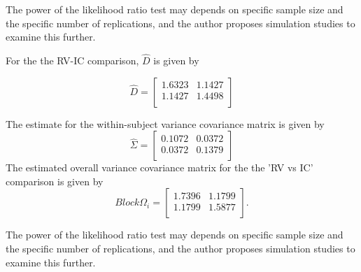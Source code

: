 The power of the
likelihood ratio test may depends on specific sample size and the
specific number of  replications, and the author proposes
simulation studies to examine this further.



For the the RV-IC comparison, $\hat{D}$ is given by


\begin{equation}
\hat{D}= \left[ \begin{array}{cc}
1.6323 & 1.1427  \\
1.1427 & 1.4498 \\
\end{array} \right]
\end{equation}

The estimate for the within-subject variance covariance matrix is
given by
\begin{equation}
\hat{\Sigma}= \left[ \begin{array}{cc}
0.1072 & 0.0372  \\
0.0372 & 0.1379  \\
\end{array}\right]
\end{equation}
The estimated overall variance covariance matrix for the the 'RV
vs IC' comparison is given by
\begin{equation}
Block \Omega_{i}= \left[ \begin{array}{cc}
1.7396 & 1.1799  \\
1.1799 & 1.5877  \\
\end{array} \right].
\end{equation}

The power of the
likelihood ratio test may depends on specific sample size and the
specific number of  replications, and the author proposes
simulation studies to examine this further.
